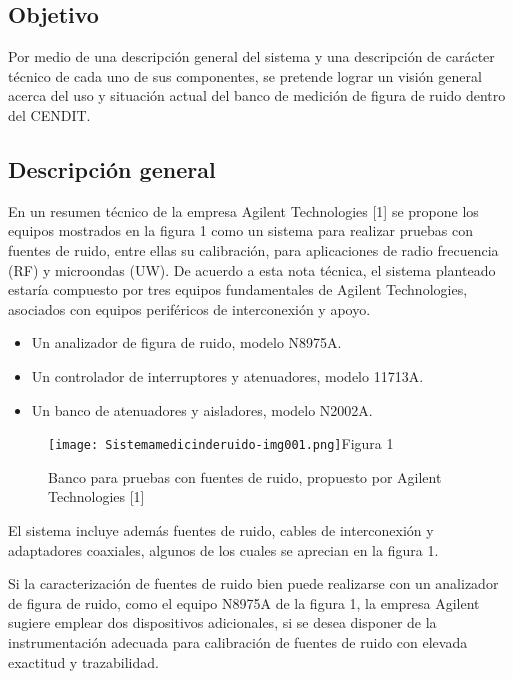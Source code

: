 \documentclass[paper=letter,oneside,fontsize=10pt,parskip=full]{article}
\begin{document}
\subsection{Objetivo }
Por medio de una descripción general del sistema y una descripción de carácter técnico de cada uno de sus componentes,
se pretende lograr un visión general acerca del uso y situación actual del banco de medición de figura de ruido dentro
del CENDIT.

\subsection{Descripción general}
En un resumen técnico de la empresa Agilent Technologies [1] se propone los equipos mostrados en la figura 1 como un
sistema para realizar pruebas con fuentes de ruido, entre ellas su calibración, para aplicaciones de radio frecuencia
(RF) y microondas (UW). De acuerdo a esta nota técnica, el sistema planteado estaría compuesto por tres equipos
fundamentales de Agilent Technologies, asociados con equipos periféricos de interconexión y apoyo.

\begin{itemize}
\item Un analizador de figura de ruido, modelo N8975A.
\item Un controlador de interruptores y atenuadores, modelo 11713A.
\item Un banco de atenuadores y aisladores, modelo N2002A.


\bigskip
\end{itemize}


\begin{figure}
\centering
\begin{minipage}{16.009cm}


\texttt{[image: Sistemamedicinderuido-img001.png]}Figura 1

Banco para pruebas con fuentes de ruido, propuesto por Agilent Technologies [1]
\end{minipage}
\end{figure}
El sistema incluye además fuentes de ruido, cables de interconexión y adaptadores coaxiales, algunos de los cuales se
aprecian en la figura 1.

Si la caracterización de fuentes de ruido bien puede realizarse con un analizador de figura de ruido, como el equipo
N8975A de la figura 1, la empresa Agilent sugiere emplear dos dispositivos adicionales, si se desea disponer de la
instrumentación adecuada para calibración de fuentes de ruido con elevada exactitud y trazabilidad. 
\end{document}
